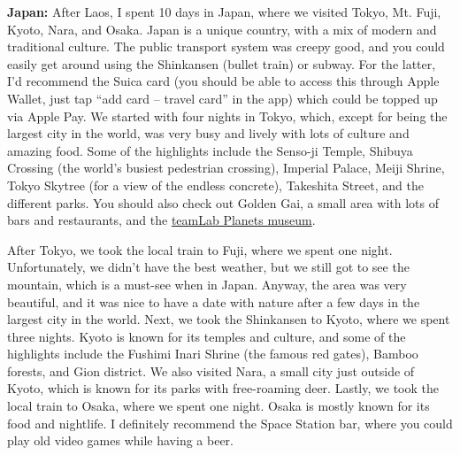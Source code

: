 \textbf{Japan:} After Laos, I spent 10 days in Japan, where we visited Tokyo, Mt. Fuji, Kyoto, Nara, and Osaka. Japan is a unique country, with a mix of modern and traditional culture. The public transport system was creepy good, and you could easily get around using the Shinkansen (bullet train) or subway. For the latter, I'd recommend the Suica card (you should be able to access this through Apple Wallet, just tap ``add card -- travel card'' in the app) which could be topped up via Apple Pay. We started with four nights in Tokyo, which, except for being the largest city in the world, was very busy and lively with lots of culture and amazing food. Some of the highlights include the Senso-ji Temple, Shibuya Crossing (the world's busiest pedestrian crossing), Imperial Palace, Meiji Shrine, Tokyo Skytree (for a view of the endless concrete), Takeshita Street, and the different parks. You should also check out Golden Gai, a small area with lots of bars and restaurants, and the \href{https://www.teamlab.art/e/tokyo/}{teamLab Planets museum}.

\begin{wrapfigure}{L}{0.26\textwidth}
    \centering
    \vspace{-0.57cm}
    \texttt{[image: figs/japan.pdf]}
    \vspace{-0.25cm}
    \caption{\raggedright Sunset over Kyoto from Fushimi Inari Shrine and incredible ramen in Tokyo.}%
    \vspace{-0.7cm}
\end{wrapfigure} 

After Tokyo, we took the local train to Fuji, where we spent one night. Unfortunately, we didn't have the best weather, but we still got to see the mountain, which is a must-see when in Japan. Anyway, the area was very beautiful, and it was nice to have a date with nature after a few days in the largest city in the world. Next, we took the Shinkansen to Kyoto, where we spent three nights. Kyoto is known for its temples and culture, and some of the highlights include the Fushimi Inari Shrine (the famous red gates), Bamboo forests, and Gion district. We also visited Nara, a small city just outside of Kyoto, which is known for its parks with free-roaming deer. Lastly, we took the local train to Osaka, where we spent one night. Osaka is mostly known for its food and nightlife. I definitely recommend the Space Station bar, where you could play old video games while having a beer.

